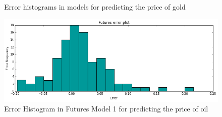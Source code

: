 \documentclass[runningheads]{llncs}
\begin{document}
\begin{figure}
\\
\caption{Error histograms in models for predicting the price of gold}
\label{fig:GoldErrorHistogram.png}
\end{figure}

\begin{figure}
\centering
\includegraphics[width=\textwidth]{futures_oil1.png}
\caption{Error Histogram in Futures Model 1 for predicting the price of oil}
\label{fig:futures_oil1.png}
\end{figure}
\end{document}

